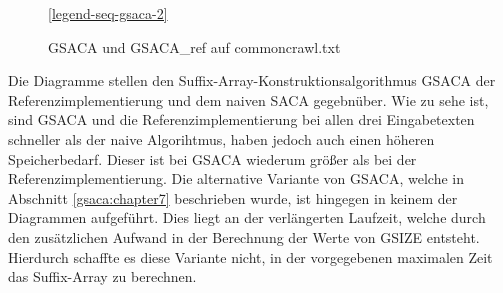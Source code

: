 \begin{figure}[ht]

    \medskip
    \ref{legend-seq-gsaca-2}
\caption{GSACA und GSACA_ref auf commoncrawl.txt}
\label{GSACA-seq-2}
\end{figure}
\FloatBarrier

Die Diagramme stellen den Suffix-Array-Konstruktionsalgorithmus GSACA der Referenzimplementierung und dem naiven SACA gegebnüber.
Wie zu sehe ist, sind GSACA und die Referenzimplementierung bei allen drei Eingabetexten schneller als der naive Algorihtmus,
haben jedoch auch einen höheren Speicherbedarf.
Dieser ist bei GSACA wiederum größer als bei der Referenzimplementierung.
Die alternative Variante von GSACA, welche in Abschnitt \ref{gsaca:chapter7} beschrieben wurde, ist hingegen in keinem der Diagrammen aufgeführt.
Dies liegt an der verlängerten Laufzeit, welche durch den zusätzlichen Aufwand in der Berechnung der Werte von GSIZE entsteht.
Hierdurch schaffte es diese Variante nicht, in der vorgegebenen maximalen Zeit das Suffix-Array zu berechnen.